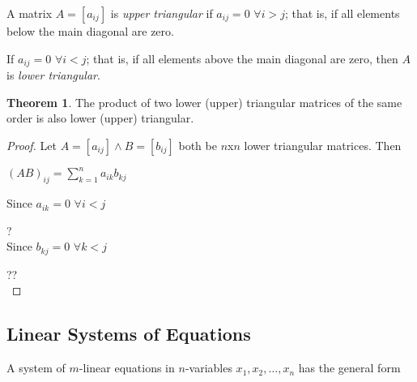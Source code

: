 \documentclass[11pt]{article}
\theoremstyle{definition}
\newtheorem{theorem}{Theorem}
\begin{document}
	A matrix $A=[a_{ij}]$ is \textit{upper triangular} if $a_{ij} = 0$ $\forall i>j$; that is, if all elements below the main diagonal are zero.
	
	If $a_{ij} = 0$ $\forall i<j$; that is, if all elements above the main diagonal are zero, then $A$ is \textit{lower triangular}.
	
	\begin{theorem}
		The product of two lower (upper) triangular matrices of the same order is also lower (upper) triangular.
	\end{theorem}

	\begin{shaded*}
		\begin{proof}
			Let $A = [a_{ij}] \land B = [b_{ij}]$ both be $n$x$n$ lower triangular matrices. Then
			
			$(AB)_{ij} = \sum\limits_{k=1}^{n}a_{ik}b_{kj}$
			
			Since $a_{ik} = 0$ $\forall i<j$
			
			? \\
			
			Since $b_{kj} = 0$ $\forall k<j$
			
			?? \\
		\end{proof}
	\end{shaded*}
	\pagebreak
	
	\subsection{Linear Systems of Equations}
	
	A system of $m$-linear equations in $n$-variables $x_1, x_2, \dots, x_n$ has the general form
\end{document}
